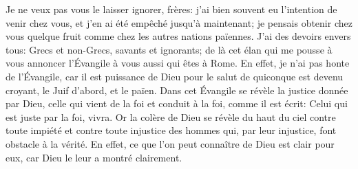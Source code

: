 Je ne veux pas vous le laisser ignorer, frères:
	j’ai bien souvent eu l’intention de venir chez vous,
	et j’en ai été empêché jusqu’à maintenant;
	je pensais obtenir chez vous quelque fruit
		comme chez les autres nations païennes.
J’ai des devoirs envers tous: Grecs et non-Grecs, savants et ignorants;
	de là cet élan qui me pousse à vous annoncer l’Évangile
		à vous aussi qui êtes à Rome.
En effet, je n’ai pas honte de l’Évangile,
	car il est puissance de Dieu pour le salut de quiconque est devenu croyant,
	le Juif d’abord, et le païen.
Dans cet Évangile se révèle la justice donnée par Dieu,
	celle qui vient de la foi et conduit à la foi,
	comme il est écrit: Celui qui est juste par la foi, vivra.
Or la colère de Dieu se révèle du haut du ciel contre toute impiété
	et contre toute injustice des hommes
		qui, par leur injustice, font obstacle à la vérité.
En effet, ce que l’on peut connaître de Dieu est clair pour eux,
	car Dieu le leur a montré clairement.
